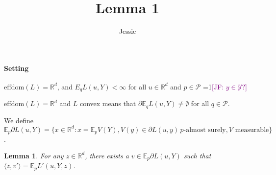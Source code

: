 \documentclass{article}
\title{Lemma 1}
\author{Jessie}
\newcommand{\Comments}{1}
\newcommand{\mynote}[2]{\ifnum\Comments=1\textcolor{#1}{#2}\fi}
\newcommand{\jessie}[1]{\mynote{purple}{[JF: #1]}}
\newcommand{\reals}{\mathbb{R}}
\newcommand{\effdom}{\mathrm{effdom}}
\newcommand{\E}{\mathbb{E}}
\renewcommand{\P}{\mathcal{P}}
\newcommand{\Y}{\mathcal{Y}}
\newcommand{\inprod}[2]{\langle #1, #2 \rangle}%
\newtheorem{lemma}{Lemma}
\begin{document}
\maketitle
\paragraph{Setting} 
$\effdom(L) = \reals^d$, and $E_q L(u,Y) < \infty$ for all $u \in \reals^d$ and $p \in \P$ \jessie{$y \in \Y$?}

$\effdom(L) = \reals^d$ and $L$ convex means that $\partial \E_q L(u,Y) \neq \emptyset$ for all $q \in \P$.

We define $\E_p \partial L(u,Y) = \{x \in \reals^d : x = \E_p V(Y), V(y) \in \partial L(u,y)\, p\textrm{-almost surely}, V \text{ measurable}\}$.

\begin{lemma}
	For any $z \in \reals^d$, there exists a $v \in \E_p \partial L(u,Y)$ such that $\inprod{z}{v'} = \E_p L'(u,Y,z)$.
\end{lemma}
\end{document}
